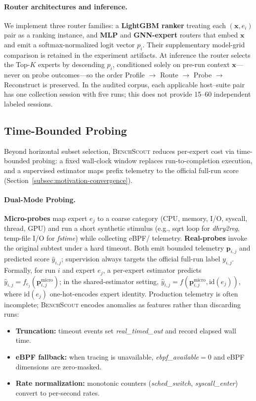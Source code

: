 \documentclass[sigconf, review, anonymous, balance=false]{acmart}
\newcommand{\ourmethod}{\textsc{BenchScout}\xspace}
\newcommand{\id}[1]{{\itshape #1}}
\begin{document}
\paragraph{Router architectures and inference.}
We implement three router families: a \textbf{LightGBM ranker} treating each $(\mathbf{x}, e_i)$ pair as a ranking instance, and \textbf{MLP} and \textbf{GNN-expert} routers that embed $\mathbf{x}$ and emit a softmax-normalized logit vector $p_i$. Their supplementary model-grid comparison is retained in the experiment artifacts.
At inference the router selects the Top-$K$ experts by descending $p_i$, conditioned solely on pre-run context $\mathbf{x}$---never on probe outcomes---so the order Profile $\rightarrow$ Route $\rightarrow$ Probe $\rightarrow$ Reconstruct is preserved. In the audited corpus, each applicable host--suite pair has one collection session with five runs; this does not provide 15--60 independent labeled sessions.


\subsection{Time-Bounded Probing}
\label{subsec:time-bounded-probing}

Beyond horizontal subset selection, \ourmethod reduces per-expert cost via time-bounded probing: a fixed wall-clock window replaces run-to-completion execution, and a supervised estimator maps prefix telemetry to the official full-run score (Section~\ref{subsec:motivation-convergence}).

\paragraph{Dual-Mode Probing.}
\textbf{Micro-probes} map expert $e_j$ to a coarse category (CPU, memory, I/O, syscall, thread, GPU) and run a short synthetic stimulus (e.g., sqrt loop for \id{dhry2reg}, temp-file I/O for \id{fstime}) while collecting eBPF/ telemetry.
\textbf{Real-probes} invoke the original subtest under a hard timeout.
Both emit bounded telemetry $\mathbf{p}_{i,j}$ and predicted score $\hat{y}_{i,j}$; supervision always targets the official full-run label $y_{i,j}$.
Formally, for run $i$ and expert $e_j$, a per-expert estimator predicts $\hat{y}_{i,j}=f_{e_j}(\mathbf{p}^{\mathrm{micro}}_{i,j})$; in the shared-estimator setting, $\hat{y}_{i,j}=f(\mathbf{p}^{\mathrm{micro}}_{i,j},\mathrm{id}(e_j))$, where $\mathrm{id}(e_j)$ one-hot-encodes expert identity.
Production telemetry is often incomplete; \ourmethod encodes anomalies as features rather than discarding runs:
\begin{itemize}
    \item \textbf{Truncation:} timeout events set \id{real\_timed\_out} and record elapsed wall time.
    \item \textbf{eBPF fallback:} when tracing is unavailable, \id{ebpf\_available}${=}0$ and eBPF dimensions are zero-masked.
    \item \textbf{Rate normalization:} monotonic counters (\id{sched\_switch}, \id{syscall\_enter}) convert to per-second rates.
\end{itemize}
\end{document}
